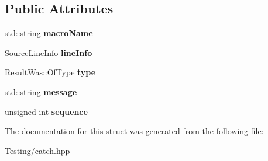 \subsection*{Public Attributes}
\begin{DoxyCompactItemize}
\item 
\hypertarget{struct_catch_1_1_message_info_a156ade4b3cc731f6ec7b542ae47ba8e3}{std\-::string {\bfseries macro\-Name}}\label{struct_catch_1_1_message_info_a156ade4b3cc731f6ec7b542ae47ba8e3}

\item 
\hypertarget{struct_catch_1_1_message_info_a985165328723e599696ebd8e43195cc5}{\hyperlink{struct_catch_1_1_source_line_info}{Source\-Line\-Info} {\bfseries line\-Info}}\label{struct_catch_1_1_message_info_a985165328723e599696ebd8e43195cc5}

\item 
\hypertarget{struct_catch_1_1_message_info_ae928b9117465c696e45951d9d0284e78}{Result\-Was\-::\-Of\-Type {\bfseries type}}\label{struct_catch_1_1_message_info_ae928b9117465c696e45951d9d0284e78}

\item 
\hypertarget{struct_catch_1_1_message_info_ab6cd06e050bf426c6577502a5c50e256}{std\-::string {\bfseries message}}\label{struct_catch_1_1_message_info_ab6cd06e050bf426c6577502a5c50e256}

\item 
\hypertarget{struct_catch_1_1_message_info_a7f4f57ea21e50160adefce7b68a781d6}{unsigned int {\bfseries sequence}}\label{struct_catch_1_1_message_info_a7f4f57ea21e50160adefce7b68a781d6}

\end{DoxyCompactItemize}


The documentation for this struct was generated from the following file\-:\begin{DoxyCompactItemize}
\item 
Testing/catch.\-hpp\end{DoxyCompactItemize}
